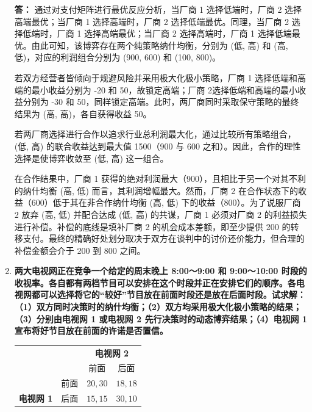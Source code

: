 \begin{enumerate}[label=\textbf{\arabic*.}, leftmargin=*]
		\textbf{答：}
		通过对支付矩阵进行最优反应分析，当厂商 1 选择低端时，厂商 2 选择高端最优；当厂商 1 选择高端时，厂商 2 选择低端最优。同理，当厂商 2 选择低端时，厂商 1 选择高端最优；当厂商 2 选择高端时，厂商 1 选择低端最优。由此可知，该博弈存在两个纯策略纳什均衡，分别为 (低, 高) 和 (高, 低)，对应的利润组合分别为 (900, 600) 和 (100, 800)。
		
		若双方经营者皆倾向于规避风险并采用极大化极小策略，厂商 1 选择低端和高端的最小收益分别为 -20 和 50，故锁定高端；厂商 2选择低端和高端的最小收益分别为 -30 和 50，同样锁定高端。此时，两厂商同时采取保守策略的最终结果为 (高, 高)，各自获得收益 50。
		
		若两厂商选择进行合作以追求行业总利润最大化，通过比较所有策略组合，(低, 高) 的联合收益达到最大值 1500（900 与 600 之和）。因此，合作的理性选择是使博弈收敛至 (低, 高) 这一组合。
		
		在合作结果中，厂商 1 获得的绝对利润最大（900），且相比于另一个对其不利的纳什均衡 (高, 低) 而言，其利润增幅最大。然而，厂商 2 在合作状态下的收益（600）低于其在非合作纳什均衡 (高, 低) 下的收益（800）。为了说服厂商 2 放弃 (高, 低) 并配合达成 (低, 高) 的共谋，厂商 1 必须对厂商 2 的利益损失进行补偿。补偿的底线是填补厂商 2 的机会成本差额，即至少提供 200 的转移支付。最终的精确好处划分取决于双方在谈判中的讨价还价能力，但合理的补偿金额会介于 200 到 800 之间。
		
		\item \textbf{两大电视网正在竞争一个给定的周末晚上 8:00～9:00 和 9:00～10:00 时段的收视率。各自都有两档节目可以安排在这个时段并正在安排它们的顺序。各电视网都可以选择将它的“较好”节目放在前面时段还是放在后面时段。试求解：（1）双方同时决策时的纳什均衡；（2）双方均采用极大化极小策略的结果；（3）分别由电视网 1 或电视网 2 先行决策时的动态博弈结果；（4）电视网 1 宣布将好节目放在前面的许诺是否置信。}
		
		\begin{center}
			\small
			\renewcommand{\arraystretch}{1.3}
			\setlength{\tabcolsep}{4pt}
			\begin{tabular}{cc|c|c|}
				\multicolumn{2}{c}{} & \multicolumn{2}{c}{\textbf{电视网 2}} \\
				\multicolumn{2}{c}{} & \multicolumn{1}{c}{前面} & \multicolumn{1}{c}{后面} \\
				\cline{3-4}
				& 前面 & $20, 30$ & $18, 18$ \\
				\cline{3-4}
				\textbf{电视网 1} & 后面 & $15, 15$ & $30, 10$ \\
				\cline{3-4}
			\end{tabular}
		\end{center}
		

\end{enumerate}
